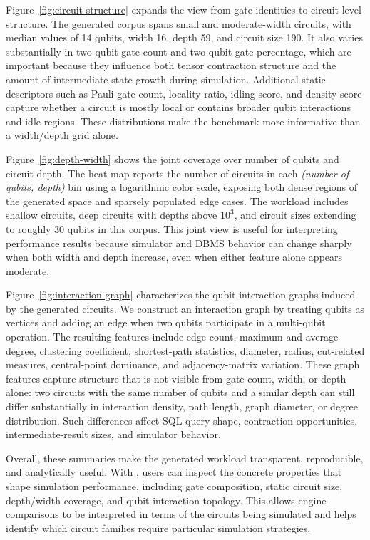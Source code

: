 \medskip
{}
Figure~\ref{fig:circuit-structure} expands the view from gate identities to circuit-level structure. The generated corpus spans small and moderate-width circuits, with median values of 14 qubits, width 16, depth 59, and circuit size 190. It also varies substantially in two-qubit-gate count and two-qubit-gate percentage, which are important because they influence both tensor contraction structure and the amount of intermediate state growth during simulation. Additional static descriptors such as Pauli-gate count, locality ratio, idling score, and density score capture whether a circuit is mostly local or contains broader qubit interactions and idle regions. These distributions make the benchmark more informative than a width/depth grid alone.

\medskip
{}
Figure~\ref{fig:depth-width} shows the joint coverage over number of qubits and circuit depth. The heat map reports the number of circuits in each \emph{(number of qubits, depth)} bin using a logarithmic color scale, exposing both dense regions of the generated space and sparsely populated edge cases. The workload includes shallow circuits, deep circuits with depths above $10^3$, and circuit sizes extending to roughly 30 qubits in this corpus. This joint view is useful for interpreting performance results because simulator and DBMS behavior can change sharply when both width and depth increase, even when either feature alone appears moderate.

\medskip
{}
Figure~\ref{fig:interaction-graph} characterizes the qubit interaction graphs induced by the generated circuits. We construct an interaction graph by treating qubits as vertices and adding an edge when two qubits participate in a multi-qubit operation. The resulting features include edge count, maximum and average degree, clustering coefficient, shortest-path statistics, diameter, radius, cut-related measures, central-point dominance, and adjacency-matrix variation. These graph features capture structure that is not visible from gate count, width, or depth alone: two circuits with the same number of qubits and a similar depth can still differ substantially in interaction density, path length, graph diameter, or degree distribution. Such differences affect SQL query shape, contraction opportunities, intermediate-result sizes, and simulator behavior.

Overall, these summaries make the generated workload transparent, reproducible, and analytically useful. With \sys, users can inspect the concrete properties that shape simulation performance, including gate composition, static circuit size, depth/width coverage, and qubit-interaction topology. This allows engine comparisons to be interpreted in terms of the circuits being simulated and helps identify which circuit families require particular simulation strategies.